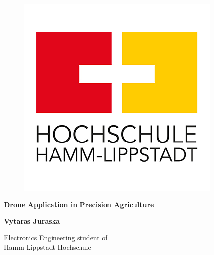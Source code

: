 \documentclass[11pt,a4paper,footinclude=true,headinclude=true, oneside]{scrbook}
\begin{document}
\begin{titlepage}
   \begin{center}
       \vspace*{1cm}

        \begin{figure}[htbp]
            \centerline{\includegraphics[scale=.5]{hs-hl.jpg}}
        \end{figure}
       \textbf{Drone Application in Precision Agriculture}
            
       \vspace{0.5cm}

       \textbf{Vytaras Juraska}

       \vfill
            
       \vspace{0.8cm}
            
       Electronics Engineering student of\\
       Hamm-Lippstadt Hochschule\\
            
   \end{center}
\end{titlepage}

	
	\tableofcontents 

\end{document}
